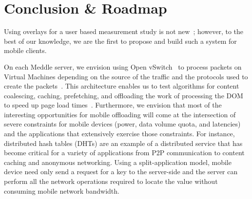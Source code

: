 \documentclass{sig-alternate-10pt}
\newcommand{\meddle}{{Meddle}\xspace}
\begin{document}
\section{Conclusion \& Roadmap}

Using overlays for a user based measurement study is not
new~\cite{Joseph:2006:OCALA}; however, to the best of our knowledge, we
are the first to propose and build such a system for mobile clients. 


On each \meddle server, we envision using Open
vSwitch~\cite{Openvswitch} to process packets on Virtual Machines
depending on the source of the traffic and the protocols used to
create the packets~\cite{Sekar:2012:ConsolidatedMBox}. This
architecture enables us to test algorithms for content coalescing,
caching, prefetching, and offloading the work of processing the DOM to
speed up page load times~\cite{silk,opera-mini,google-spdy}.
Furthermore, we envision that most of the interesting opportunities
for mobile offloading will come at the intersection of severe
constraints for mobile devices (power, data volume quota, and
latencies) and the applications that extensively exercise those
constraints. For instance, distributed hash tables (DHTs) are an
example of a distributed service that has become critical for a
variety of applications from P2P communication to content caching and
anonymous networking. Using a split-application model, mobile device
need only send a request for a key to the server-side and the server
can perform all the network operations required to locate the value
without consuming mobile network bandwidth.

\scriptsize


\normalsize
\end{document}
